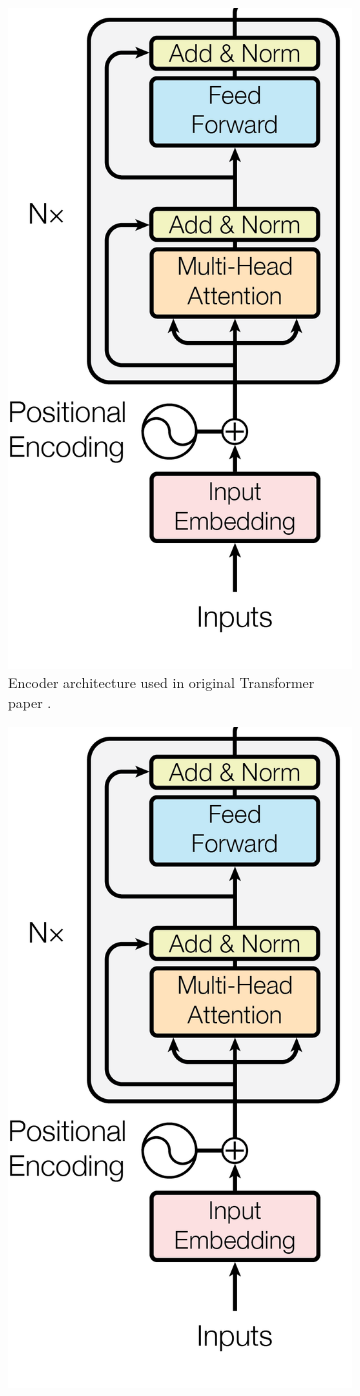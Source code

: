 \begin{figure}[!htb]
\begin{subfigure}{0.5\textwidth}
    \centering
    \includegraphics[width=0.5\linewidth]{modeling/transformer.png}  
    \caption{Encoder architecture used in original Transformer paper \citep{attentionAllYouNeed}.}
    \label{modeling.transformer.origEncoder}
\end{subfigure}
\hspace{5mm}
\begin{subfigure}{0.5\textwidth}
    \centering
    \includegraphics[width=0.5\linewidth]{modeling/transformer.png}   

\end{subfigure}
\end{figure}

